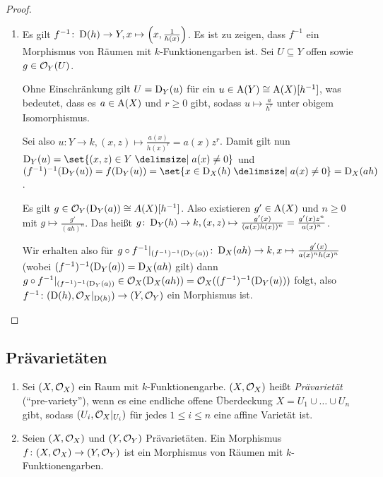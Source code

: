 \documentclass[12pt,a4paper]{scrartcl}
\theoremstyle{cplain}
\theoremstyle{cdef}
\begin{document}
\begin{proof}
\begin{enumerate}[label=\ref{lem:10.13:\roman*}]
\begin{enumerate}[label=\ref{lem:10.13:ii:\alph*}]
			\item Es gilt $f^{-1}\colon \operatorname{D}(h)\to Y, x\mapsto \left(x,\frac 1{h(x)}\right)$. Es ist zu zeigen, dass $f^{-1}$ ein Morphismus von Räumen mit $k$-Funktionengarben ist. Sei $U\subseteq Y$ offen sowie $g\in \mathcal{O}_Y(U)$.
			
			Ohne Einschränkung gilt $U = \operatorname{D}_Y(u)$ für ein $u\in \operatorname{A}(Y) \cong \operatorname{A}(X)[h^{-1}]$, was bedeutet, dass es $a\in \operatorname{A}(X)$ und $r\ge 0$ gibt, sodass $u\mapsto \frac a{h^r}$ unter obigem Isomorphismus.
			
			Sei also $u\colon Y\to k, (x,z)\mapsto \frac{a(x)}{h(x)^r} = a(x)z^r$. Damit gilt nun $\D_Y(u) = \set{(x,z)\in Y\given a(x) \neq 0}$ und $(f^{-1})^{-1}(\D_Y(u)) = f(\D_Y(u)) = \set {x\in \D_X(h)\given a(x) \neq 0} = \D_X(ah)$.
			
			Es gilt $g\in \mathcal{O}_Y(\operatorname{D}_Y(a)) \cong A(X)[h^{-1}]$. Also existieren $g'\in \operatorname{A}(X)$ und $n\ge 0$ mit $g\mapsto \frac{g'}{(ah)^n}$. Das heißt $g\colon \operatorname{D}_Y(h)\to k, (x,z)\mapsto \frac{g'(x)}{(a(x)h(x))^n} = \frac{g'(x)z^n}{a(x)^n}$.
			
			Wir erhalten also für $g\circ f^{-1}|_{(f^{-1})^{-1}(\operatorname{D}_Y(a))} \colon \operatorname{D}_X(ah)\to k, x\mapsto \frac{g'(x)}{a(x)^nh(x)^n}$ (wobei $(f^{-1})^{-1}(\operatorname{D}_Y(a)) = \operatorname{D}_X(ah)$ gilt) dann $g\circ f^{-1}|_{(f^{-1})^{-1}(\operatorname{D}_Y(a))} \in \mathcal{O}_X(\operatorname{D}_X(ah)) = \mathcal{O}_X((f^{-1})^{-1}(\operatorname{D}_Y(u)))$ folgt, also $f^{-1}\colon (\operatorname{D}(h), \mathcal{O}_X|_{\operatorname{D}(h)}) \to (Y,\mathcal{O}_Y)$ ein Morphismus ist.
			\qedhere
		\end{enumerate}
	\end{enumerate}
\end{proof}

\subsection{Prävarietäten}

\begin{defi}
	\leavevmode
	\begin{enumerate}
		\item Sei $(X,\mathcal{O}_X)$ ein Raum mit $k$-Funktionengarbe. $(X,\mathcal{O}_X)$ heißt \emph{Prävarietät} (\enquote{pre-variety}), wenn es eine endliche offene Überdeckung $X = U_1\cup\dots\cup U_n$ gibt, sodass $(U_i,\mathcal{O}_X|_{U_i})$ für jedes $1\le i \le n$ eine affine Varietät ist.
		\item Seien $(X,\mathcal{O}_X)$ und $(Y, \mathcal{O}_Y)$ Prävarietäten. Ein Morphismus $f\colon (X,\mathcal{O}_X)\to (Y,\mathcal{O}_Y)$ ist ein Morphismus von Räumen mit $k$-Funktionengarben.
	\end{enumerate}
\end{defi}

\end{document}
